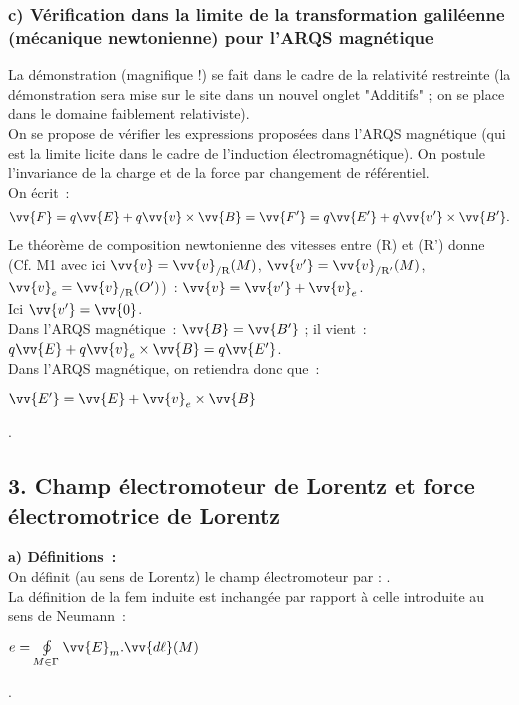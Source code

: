 \documentclass{article}
\newcommand{\mathcolorbox}[2]{\colorbox{#1}{$#2$}}
\let\oldoint\oint
\renewcommand{\oint}{\oldoint\limits}
\renewcommand\overrightarrow{\vv}
\begin{document}
\subsubsection*{c) Vérification dans la limite de la transformation
galiléenne (mécanique newtonienne) pour l'ARQS magnétique}
La démonstration (magnifique !) se fait dans le cadre de
la relativité restreinte (la démonstration sera mise sur le site
dans un nouvel onglet
"Additifs" ; on se place dans le domaine faiblement relativiste). \\
On se propose de vérifier les expressions proposées dans l'ARQS
magnétique (qui est la limite licite dans le cadre de l'induction
électromagnétique). On postule l'invariance de la charge et de la
force par
changement de référentiel. \\
On écrit :
\begin{eqnarray}\label{Eq.10}
\overrightarrow{F}=q\overrightarrow{E}+q\overrightarrow{v}\times\overrightarrow{B}
=
\overrightarrow{F'}=q\overrightarrow{E'}+q\overrightarrow{v'}\times\overrightarrow{B'}.
\end{eqnarray}
Le théorème de composition newtonienne des vitesses entre (R) et
(R') donne (Cf. M1 avec ici $\overrightarrow{v} =
\overrightarrow{v}_{\mathrm{/R}}(M)$, $\overrightarrow{v'} =
\overrightarrow{v}_{\mathrm{/R'}}(M)$, $\overrightarrow{v}_{e} =
\overrightarrow{v}_{\mathrm{/R}}(O')$) : $\overrightarrow{v} =
\overrightarrow{v'}+\overrightarrow{v}_{e}$. \\
Ici $\overrightarrow{v'} = \overrightarrow{0}$. \\
Dans l'ARQS magnétique : $\overrightarrow{B} = \overrightarrow{B'}$
; il vient : $q\overrightarrow{E}+q\overrightarrow{v}_{e} \times
\overrightarrow{B} = q\overrightarrow{E'}$. \\
Dans l'ARQS magnétique, on retiendra donc que : \\
\centerline{\mathcolorbox{gray!20}{\overrightarrow{E'}=\overrightarrow{E}+\overrightarrow{v}_{e}
\times \overrightarrow{B}}}.

\subsection*{3. Champ électromoteur de Lorentz et force électromotrice
de Lorentz} \textbf{ a)  Définitions :} \\
On définit (au sens de Lorentz) le champ électromoteur par
: \fbox{$\overrightarrow{E}_{m}=\overrightarrow{v}_{e}\times
\overrightarrow{B}$}.
\\
La définition de la fem induite est inchangée par rapport à celle introduite au sens de Neumann : \\
\centerline{\mathcolorbox{gray!20}{e=\oint_{M\in
\Gamma}\overrightarrow{E}_{m}.\overrightarrow{d\ell}(M)}}.
\end{document}
